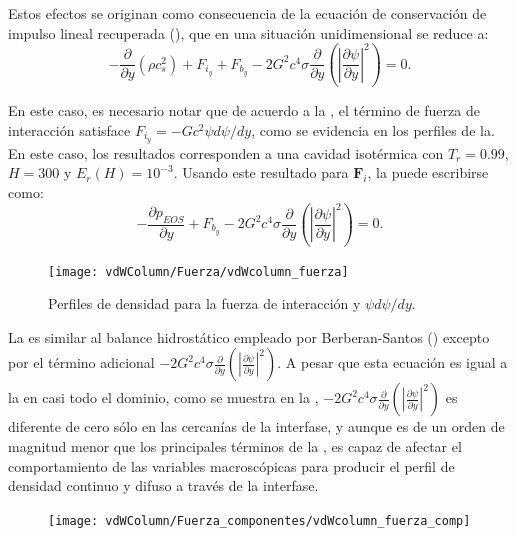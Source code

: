 Estos efectos se originan como consecuencia de la ecuaci\'on de conservaci\'on de impulso lineal recuperada (), que en una situaci\'on unidimensional se reduce a:
\begin{equation}
	-\dfrac{\partial}{\partial y}(\rho c_s^2) + F_{i_y} + F_{b_y} - 2 G^2 c^4 \sigma \dfrac{\partial}{\partial y} \left( \left| \dfrac{\partial \psi}{\partial y} \right|^2  \right) = 0.
	\label{eq:li_macro_1d}
\end{equation}


En este caso, es necesario notar que de acuerdo a la , el t\'ermino de fuerza de interacci\'on satisface $F_{i_y} = -Gc^2 \psi d\psi / dy$, como se evidencia en los perfiles de la. En este caso, los resultados corresponden a una cavidad isot\'ermica con $T_r = 0.99$, $H=300$ y $E_r(H)=10^{-3}$. Usando este resultado para $\bm{F}_i$, la  puede escribirse como:
\begin{equation}
	-\dfrac{\partial p_{EOS}}{\partial y} + F_{b_y} - 2 G^2 c^4 \sigma \dfrac{\partial}{\partial y} \left( \left| \dfrac{\partial \psi}{\partial y} \right|^2  \right) = 0.
	\label{eq:li_macro_1d_peos}
\end{equation}

\begin{figure}[ht]
	\centering
	\texttt{[image: vdWColumn/Fuerza/vdWcolumn\_fuerza]}
	\caption{Perfiles de densidad para la fuerza de interacci\'on y $\psi d\psi / dy$.}
	\label{fig:vdWColumn_TUniform_fuerza}
\end{figure}

La  es similar al balance hidrost\'atico empleado por Berberan-Santos () excepto por el t\'ermino adicional $- 2 G^2 c^4 \sigma \frac{\partial}{\partial y} \left( \left| \frac{\partial \psi}{\partial y} \right|^2  \right)$. A pesar que esta ecuaci\'on es igual a la  en casi todo el dominio, como se muestra en la , $- 2 G^2 c^4 \sigma \frac{\partial}{\partial y} \left( \left| \frac{\partial \psi}{\partial y} \right|^2  \right)$ es diferente de cero s\'olo en las cercan\'ias de la interfase, y aunque es de un orden de magnitud menor que los principales t\'erminos de la , es capaz de afectar el comportamiento de las variables macrosc\'opicas para producir el perfil de densidad continuo y difuso a trav\'es de la interfase.


\begin{figure}[ht]
	\centering
	\texttt{[image: vdWColumn/Fuerza\_componentes/vdWcolumn\_fuerza\_comp]}
	\caption{}
	\label{fig:vdWColumn_fuerza_terminos}
\end{figure}
\FloatBarrier